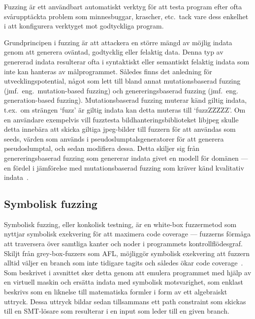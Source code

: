 Fuzzing är ett användbart automatiskt verktyg för att testa program efter ofta
svårupptäckta problem som minnesbuggar, krascher, etc.\ tack vare dess enkelhet i
att konfigurera verktyget mot godtyckliga program.

Grundprincipen i fuzzing är att attackera en större mängd av möjlig indata genom
att generera oväntad, godtycklig eller felaktig data. Denna typ av genererad
indata resulterar ofta i syntaktiskt eller semantiskt felaktig indata som inte
kan hanteras av målprogrammet. Således finns det anledning för
utvecklingspotential, något som lett till bland annat mutationsbaserad fuzzing
(jmf.\ eng.\ mutation-based fuzzing) och genereringsbaserad fuzzing (jmf.\ eng.
generation-based fuzzing). Mutationsbaserad fuzzing muterar känd giltig indata,
t.ex.\ om strängen `fuzz' är giltig indata kan detta muteras till `fuzzZZZZZ'. Om
en användare exempelvis vill fuzztesta bildhanteringsbiblioteket libjpeg skulle
detta innebära att skicka giltiga jpeg-bilder till fuzzern för att användas som
seeds, värden som används i pseudoslumptalsgeneratorer för att generera
pseudoslumptal, och sedan modifiera dessa. Detta skiljer sig från
genereringsbaserad fuzzing som genererar indata givet en modell för domänen ---
en fördel i jämförelse med mutationsbaserad fuzzing som kräver känd kvalitativ
indata~\cite{fuzzing}.

\subsection{Symbolisk fuzzing} Symbolisk fuzzing, eller konkolisk testning, är en
white-box fuzzermetod som nyttjar symbolisk exekvering för att maximera code
coverage --- fuzzerns förmåga att traversera över samtliga kanter och noder i
programmets kontrollflödesgraf. Skiljt från grey-box-fuzzers som AFL, möjliggör
symbolisk exekvering att fuzzern alltid väljer en branch som inte tidigare
tagits och således ökar code coverage~\cite{challenges_fuzzing}. Som beskrivet i
avsnittet  sker detta genom att emulera programmet
med hjälp av en virtuell maskin och ersätta indata med symbolisk motsvarighet,
som enklast beskrivs som en liknelse till matematiska formler i form av ett
algebraiskt uttryck. Dessa uttryck bildar sedan tillsammans ett path constraint
som skickas till en SMT-lösare som resulterar i en input som leder till en given
branch.

